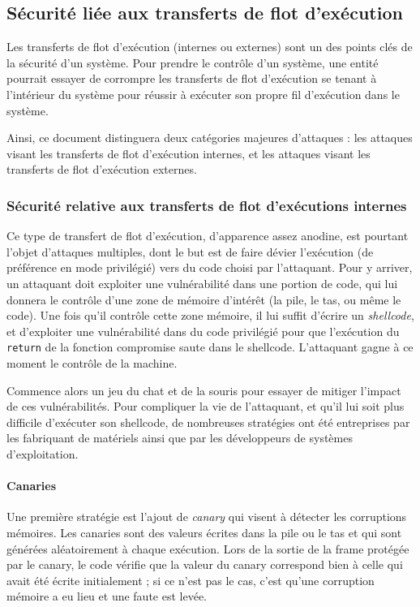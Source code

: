 		\subsection{Sécurité liée aux transferts de flot d'exécution}

		Les transferts de flot d'exécution (internes ou externes) sont un des points clés de la sécurité d'un système. Pour prendre le contrôle d'un système, une entité pourrait essayer de corrompre les transferts de flot d'exécution se tenant à l'intérieur du système pour réussir à exécuter son propre fil d'exécution dans le système.

		Ainsi, ce document distinguera deux catégories majeures d'attaques : les attaques visant les transferts de flot d'exécution internes, et les attaques visant les transferts de flot d'exécution externes.

		\subsubsection{Sécurité relative aux transferts de flot d'exécutions internes}
Ce type de transfert de flot d'exécution, d'apparence assez anodine, est pourtant l'objet d'attaques multiples, dont le but est de faire dévier l'exécution (de préférence en mode privilégié) vers du code choisi par l'attaquant. Pour y arriver, un attaquant doit exploiter une vulnérabilité dans une portion de code, qui lui donnera le contrôle d'une zone de mémoire d'intérêt (la pile, le tas, ou même le code). Une fois qu'il contrôle cette zone mémoire, il lui suffit d'écrire un \emph{shellcode}, et d'exploiter une vulnérabilité dans du code privilégié pour que l'exécution du \texttt{return} de la fonction compromise saute dans le shellcode. L'attaquant gagne à ce moment le contrôle de la machine.

Commence alors un jeu du chat et de la souris pour essayer de mitiger l'impact de ces vulnérabilités. Pour compliquer la vie de l'attaquant, et qu'il lui soit plus difficile d'exécuter son shellcode, de nombreuses stratégies ont été entreprises par les fabriquant de matériels ainsi que par les développeurs de systèmes d'exploitation. 

\paragraph{Canaries}
Une première stratégie est l'ajout de \emph{canary} qui visent à détecter les corruptions mémoires. Les canaries sont des valeurs écrites dans la pile ou le tas et qui sont générées aléatoirement à chaque exécution. Lors de la sortie de la frame protégée par le canary, le code vérifie que la valeur du canary correspond bien à celle qui avait été écrite initialement ; si ce n'est pas le cas, c'est qu'une corruption mémoire a eu lieu et une faute est levée.

